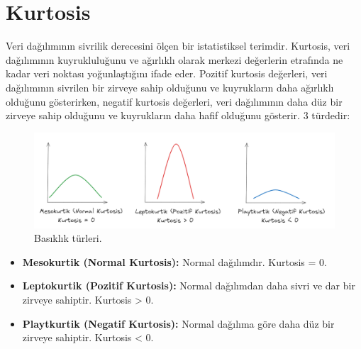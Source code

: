 \section{Kurtosis}
Veri dağılımının sivrilik derecesini ölçen bir istatistiksel terimdir. Kurtosis, veri dağılımının kuyrukluluğunu ve ağırlıklı olarak merkezi değerlerin etrafında ne kadar veri noktası yoğunlaştığını ifade eder. Pozitif kurtosis değerleri, veri dağılımının sivrilen bir zirveye sahip olduğunu ve kuyrukların daha ağırlıklı olduğunu gösterirken, negatif kurtosis değerleri, veri dağılımının daha düz bir zirveye sahip olduğunu ve kuyrukların daha hafif olduğunu gösterir. 3 türdedir:

\begin{figure}[h]
    \centering
    \includegraphics[width=1\textwidth]{images/kurtosis.png}
    \caption{Basıklık türleri.}
    \label{fig:enter-label}
\end{figure}

\begin{itemize}
    \item \textbf{Mesokurtik (Normal Kurtosis):} Normal dağılımdır. Kurtosis = 0.
    \item \textbf{Leptokurtik (Pozitif Kurtosis):} Normal dağılımdan daha sivri ve dar bir zirveye sahiptir. Kurtosis > 0.
    \item \textbf{Playtkurtik (Negatif Kurtosis):} Normal dağılıma göre daha düz bir zirveye sahiptir. Kurtosis < 0.
\end{itemize}

\newpage